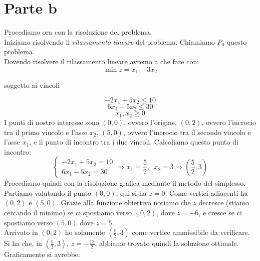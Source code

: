 \documentclass[a4paper,12pt, oneside]{book}
\begin{document}
\section{Parte b}
Procediamo ora con la risoluzione del problema.\\
Iniziamo risolvendo il \textit{rilassamento lineare} del
problema. Chiamiamo $P_0$ questo problema.\\
Dovendo risolvere il rilassamento lineare avremo a che fare con:
\[\min z=x_1-3x_2\]
\begin{center}
  soggetto ai vincoli
\end{center}
\[-2x_1+5x_2\leq 10\]
\[6x_1-5x_2\leq 30\]
\[x_1,x_2\geq 0\]
I punti di nostro interesse sono $(0,0)$, ovvero l'origine, $(0,2)$,
ovvero l'incrocio tra il primo vincolo e l'asse $x_2$, $(5,0)$, ovvero
l'incrocio tra il secondo vincolo e l'asse $x_1$, e il punto di
incontro tra i due vincoli. Calcoliamo questo punto di incontro:
\[
  \begin{cases}
    -2x_1+5x_2= 10\\
    6x_1-5x_2=30
  \end{cases}\Longrightarrow
  x_1=\frac{5}{2},\,\,\,x_2=3\Longrightarrow (\frac{5}{2},3)
\]
\newpage
Procediamo quindi con la risoluzione grafica mediante il metodo del
simplesso.\\
Partiamo valutando il punto $(0,0)$, qui si ha $z=0$. Come vertici
adiacenti ha $(0,2)$ e $(5,0)$. Grazie alla funzione obiettivo notiamo
che $z$ decresce (stiamo cercando il minimo) se ci spostiamo verso
$(0,2)$, dove $z=-6$, e cresce se ci spostiamo verso $(5,0)$ dove
$z=5$.\\
Arrivato in $(0,2)$ ho solamente $(\frac{5}{2},3)$ come vertice
ammissibile da verificare. Si ha che, in $(\frac{5}{2},3)$,
$z=-\frac{13}{2}$, abbiamo trovato quindi la soluzione
ottimale. Graficamente si avrebbe:
\end{document}
